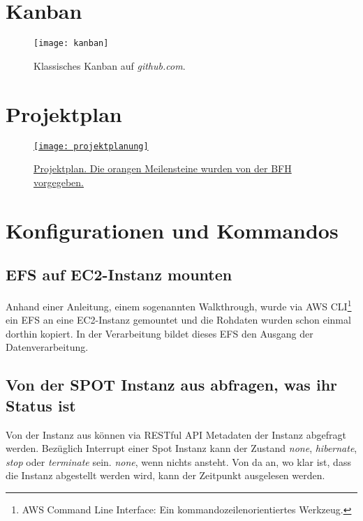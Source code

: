 \section{Kanban}\label{appendix:kanban}
\begin{figure}[H]
	\centering
	\texttt{[image: kanban]}
	\caption{Klassisches Kanban auf \emph{github.com}.}
	\label{fig:Klassisches Kanban}
\end{figure}

\section{Projektplan}\label{appendix:projektplan}
\begin{figure}[H]
	\centering
	\href{https://docs.google.com/spreadsheets/d/1zKTZgt4BW736G0xRfU9o3vWYwAJj-8nzFvGsPR7yJ_0/edit?usp=sharing}{
	\texttt{[image: projektplanung]}}
	\caption{\href{https://docs.google.com/spreadsheets/d/1zKTZgt4BW736G0xRfU9o3vWYwAJj-8nzFvGsPR7yJ_0/edit?usp=sharing}{Projektplan. Die orangen Meilensteine wurden von der BFH vorgegeben.}}
	\label{fig:Projektplan}
\end{figure}

\section{Konfigurationen und Kommandos}
\subsection{EFS auf EC2-Instanz mounten}
Anhand einer Anleitung, einem sogenannten Walkthrough, wurde via AWS CLI\footnote{AWS Command Line Interface: Ein kommandozeilenorientiertes Werkzeug.} ein
EFS an eine EC2-Instanz gemountet und die Rohdaten wurden schon einmal dorthin kopiert. In der Verarbeitung bildet dieses EFS den Ausgang der Datenverarbeitung.


\subsection{Von der SPOT Instanz aus abfragen, was ihr Status ist}\label{appendix:restful}
Von der Instanz aus können via RESTful API Metadaten der Instanz abgefragt werden. Bezüglich Interrupt einer Spot Instanz kann der Zustand \emph{none}, \emph{hibernate}, \emph{stop} oder \emph{terminate} sein. \emph{none}, wenn nichts ansteht. Von da an, wo klar ist, dass die Instanz abgestellt werden wird, kann der Zeitpunkt ausgelesen werden.

